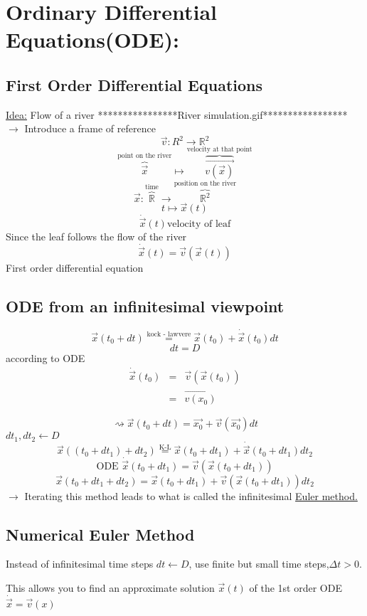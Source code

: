 \documentclass[a4paper, 12pt]{article}
\begin{document}
\section{Ordinary Differential Equations(ODE):} 
\subsection{First Order Differential Equations}
\underline{Idea:} Flow of a river
****************River simulation.gif*****************
$\rightarrow$ Introduce a frame of reference\\
$$\vec{v}:R^2 \rightarrow \mathbb{R}^2$$
$$\overbrace{\vec{x}}^{\text{point on the river}} \mapsto \overbrace{\vec{v(\vec{x})}}^{\text{velocity at that point}}$$
$$\vec{x} : \overbrace{\mathbb{R}}^{\text{time}} \rightarrow \overbrace{\mathbb{R}^2}^{\text{position on the river}}$$
$$t \mapsto \vec{x}(t)$$
$$\dot{\vec{x}}(t) \text{velocity of leaf}$$
Since the leaf follows the flow of the river
$$\dot{\vec{x}}(t) = \vec{v}(\vec{x}(t))$$
First order differential equation
\subsection{ODE from an infinitesimal viewpoint}
\begin{multicols}{2}
\begin{center}
\end{center}
$$\vec{x}(t_0 + dt) \overset{\text{kock - lawvere}}{=} \vec{x}(t_0) + \dot{\vec{x}}(t_0)dt$$
$$dt = D$$
according to ODE
\begin{eqnarray*}
\dot{\vec{x}}(t_0) &=& \vec{v}(\vec{x}(t_0))\\
&=& \vec{v(x_0)}
\end{eqnarray*}
\end{multicols}
$$\rightsquigarrow \vec{x}(t_0 + dt) = \vec{x_0} + \vec{v}(\vec{x_0})dt$$
$dt_1 , dt_2 \leftarrow D$
$$\vec{x}((t_0+dt_1)+dt_2) \overset{\text{K-L}}{=} \vec{x}(t_0 + dt_1) + \dot{\vec{x}}(t_0 + dt_1)dt_2$$
$$\text{ODE } \dot{\vec{x}}(t_0 + dt_1) = \vec{v}(\vec{x}(t_0 + dt_1))$$
$$ \vec{x}(t_0 + dt_1 + dt_2) = \vec{x}(t_0+dt_1) + \vec{v}(\vec{x}(t_0+dt_1))dt_2$$
$\rightarrow$ Iterating this method leads to what is called the infinitesimal \underline{Euler method.}
\subsection{Numerical Euler Method}
Instead of infinitesimal time steps $dt\leftarrow D$, use finite but small time steps,$\Delta t>0$.
\begin{center}
\end{center}
This allows you to find an approximate solution $\vec{x}(t)$ of the 1st order ODE $\dot{\vec{x}} = \vec{v}(x)$
\end{document}
